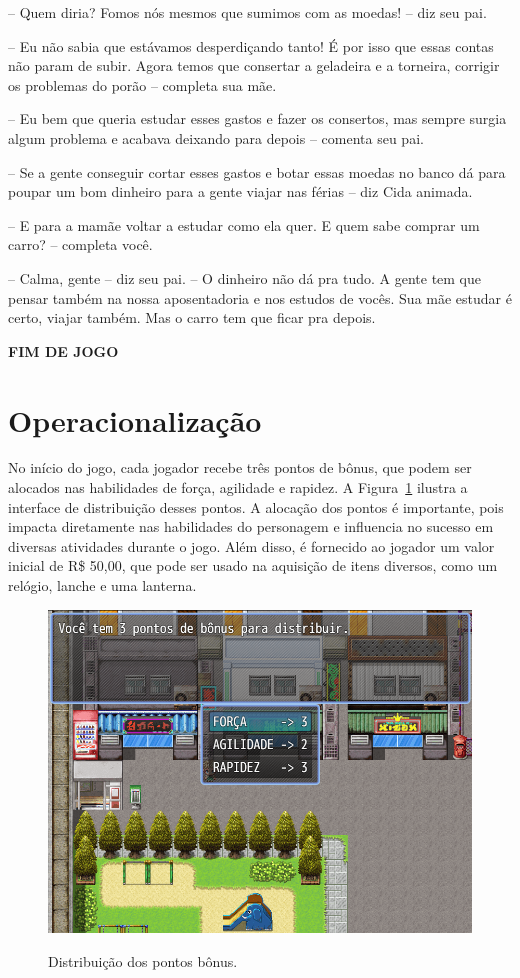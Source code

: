 -- Quem diria? Fomos nós mesmos que sumimos com as moedas! -- diz seu pai.

-- Eu não sabia que estávamos desperdiçando tanto! É por isso que essas contas não param de subir. Agora temos que consertar a geladeira e a torneira, corrigir os problemas do porão -- completa sua mãe.

-- Eu bem que queria estudar esses gastos e fazer os consertos, mas sempre surgia algum problema e acabava deixando para depois -- comenta seu pai.

-- Se a gente conseguir cortar esses gastos e botar essas moedas no banco dá para poupar um bom dinheiro para a gente viajar nas férias -- diz Cida animada.

-- E para a mamãe voltar a estudar como ela quer. E quem sabe comprar um carro? -- completa você.

-- Calma, gente -- diz seu pai. -- O dinheiro não dá pra tudo. A gente tem que pensar também na nossa aposentadoria e nos estudos de vocês. Sua mãe estudar é certo, viajar também. Mas o carro tem que ficar pra depois.

\textbf{FIM DE JOGO}

\section{Operacionalização}

No início do jogo, cada jogador recebe três pontos de bônus, que podem ser alocados nas habilidades de força, agilidade e rapidez. A Figura~\ref{fig:distribui-bonus} ilustra a interface de distribuição desses pontos. A alocação dos pontos é importante, pois impacta diretamente nas habilidades do personagem e influencia no sucesso em diversas atividades durante o jogo. Além disso, é fornecido ao jogador um valor inicial de R\$ 50,00, que pode ser usado na aquisição de itens diversos, como um relógio, lanche e uma lanterna.

\begin{figure}[!htbp]
	\centering
	\caption{Distribuição dos pontos bônus.}
	\includegraphics[scale=0.55]{Textuais/Pictures/Distribui-bonus.png}
	\label{fig:distribui-bonus}
\end{figure}

